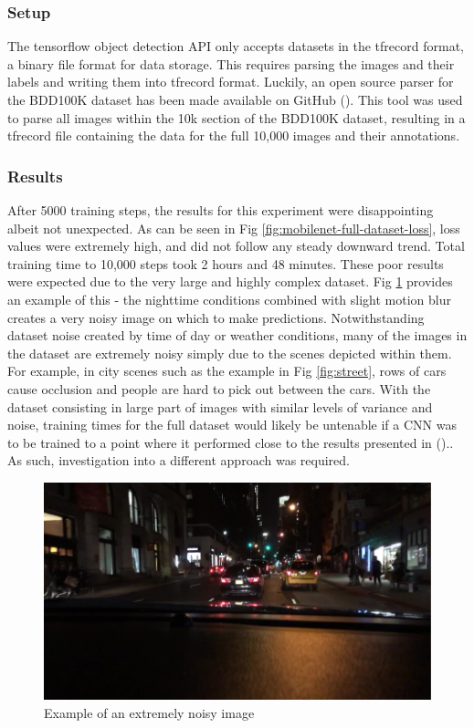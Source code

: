 \documentclass[12pt]{report}
\begin{document}
\subsubsection{Setup}
\begin{flushleft}
The tensorflow object detection API only accepts datasets in the tfrecord format, a binary file format for data storage. This requires parsing the images and their labels and writing them into tfrecord format. Luckily, an open source parser for the BDD100K dataset has been made available on GitHub (\cite{parser}). This tool was used to parse all images within the 10k section of the BDD100K dataset, resulting in a tfrecord file containing the data for the full 10,000 images and their annotations.
\end{flushleft}

\subsubsection{Results}
\begin{flushleft}
After 5000 training steps, the results for this experiment were disappointing albeit not unexpected. As can be seen in Fig \ref{fig:mobilenet-full-dataset-loss}, loss values were extremely high, and did not follow any steady downward trend. Total training time to 10,000 steps took 2 hours and 48 minutes. These poor results were expected due to the very large and highly complex dataset. Fig \ref{fig:noisy} provides an example of this - the nighttime conditions combined with slight motion blur creates a very noisy image on which to make predictions. Notwithstanding dataset noise created by time of day or weather conditions, many of the images in the dataset are extremely noisy simply due to the scenes depicted within them. For example, in city scenes such as the example in Fig \ref{fig:street}, rows of cars cause occlusion and people are hard to pick out between the cars. With the dataset consisting in large part of images with similar levels of variance and noise, training times for the full dataset would likely be untenable if a CNN was to be trained to a point where it performed close to the results presented in (\cite{yu2018bdd100k}).. As such, investigation into a different approach was required.
\end{flushleft}

\vspace{0.5cm}
\begin{figure}[ht!]
	\centering
	\includegraphics[width=12cm]{noisy}
	\caption{Example of an extremely noisy image}
	\label{fig:noisy}
\end{figure}
\end{document}
